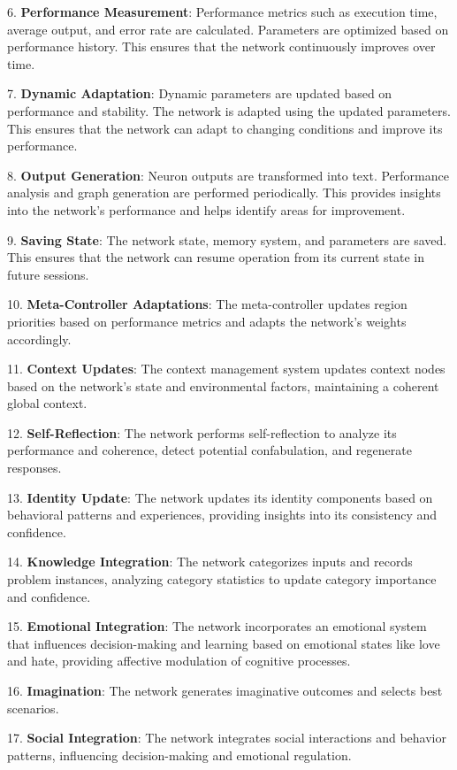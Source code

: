\documentclass{article}
\begin{document}
6. \textbf{Performance Measurement}: Performance metrics such as execution time, average output, and error rate are calculated. Parameters are optimized based on performance history. This ensures that the network continuously improves over time.

7. \textbf{Dynamic Adaptation}: Dynamic parameters are updated based on performance and stability. The network is adapted using the updated parameters. This ensures that the network can adapt to changing conditions and improve its performance.

8. \textbf{Output Generation}: Neuron outputs are transformed into text. Performance analysis and graph generation are performed periodically. This provides insights into the network's performance and helps identify areas for improvement.

9. \textbf{Saving State}: The network state, memory system, and parameters are saved. This ensures that the network can resume operation from its current state in future sessions.

10. \textbf{Meta-Controller Adaptations}: The meta-controller updates region priorities based on performance metrics and adapts the network's weights accordingly.

11. \textbf{Context Updates}: The context management system updates context nodes based on the network's state and environmental factors, maintaining a coherent global context.

12. \textbf{Self-Reflection}: The network performs self-reflection to analyze its performance and coherence, detect potential confabulation, and regenerate responses.

13. \textbf{Identity Update}: The network updates its identity components based on behavioral patterns and experiences, providing insights into its consistency and confidence.

14. \textbf{Knowledge Integration}: The network categorizes inputs and records problem instances, analyzing category statistics to update category importance and confidence.

15. \textbf{Emotional Integration}: The network incorporates an emotional system that influences decision-making and learning based on emotional states like love and hate, providing affective modulation of cognitive processes.

16. \textbf{Imagination}: The network generates imaginative outcomes and selects best scenarios.

17. \textbf{Social Integration}: The network integrates social interactions and behavior patterns, influencing decision-making and emotional regulation.
\end{document}
